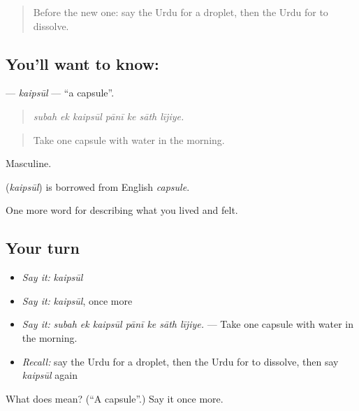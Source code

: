 \begin{quote}
Before the new one: say the Urdu for a droplet, then the Urdu for to dissolve.
\end{quote}

\subsection*{You'll want to know: }
\textbf{} — \emph{kaipsūl} — \textquotedblleft{}a capsule\textquotedblright{}.

\begin{quote}
      
\end{quote}

\begin{quote}
\emph{subah ek kaipsūl pānī ke sāth lījiye.}
\end{quote}

\begin{quote}
Take one capsule with water in the morning.
\end{quote}

Masculine.

\begin{cousinweb}
\textbf{} (\emph{kaipsūl}) is borrowed from English \emph{capsule}.
\end{cousinweb}

\begin{grammarlens}[title={What you've built}]
One more word for describing what you lived and felt.
\end{grammarlens}

\subsection*{Your turn}
\begin{itemize}
\raggedright
  \item \emph{Say it:} \emph{kaipsūl}
  \item \emph{Say it:} \emph{kaipsūl}, once more
  \item \emph{Say it:} \emph{subah ek kaipsūl pānī ke sāth lījiye.} — Take one capsule with water in the morning.
  \item \emph{Recall:} say the Urdu for a droplet, then the Urdu for to dissolve, then say \emph{kaipsūl} again
\end{itemize}

\begin{tcolorbox}[breakable,colback=teal!4,colframe=teal!35!black,title={Before you move on}]
What does  mean? (\textquotedblleft{}A capsule\textquotedblright{}.) Say it once more.
\end{tcolorbox}
